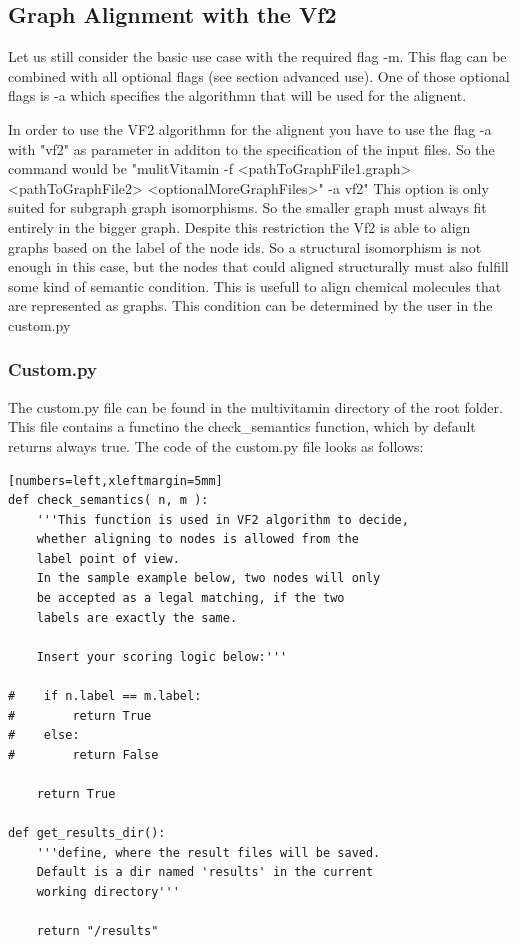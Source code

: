\documentclass{SeminarV2}
\begin{document}
\subsection{Graph Alignment with the Vf2}
Let us still consider the basic use case with the required flag -m. This flag can
be combined with all optional flags (see section advanced use). One of those optional
flags is -a which specifies the algorithmn that will be used for the alignent.

In order to use the VF2 algorithmn for the alignent you have to use the flag
-a with  "vf2" as parameter in additon to the specification of the input files. So the command would be
"mulitVitamin -f <pathToGraphFile1.graph> <pathToGraphFile2> <optionalMoreGraphFiles>" -a vf2"
This option is only suited for subgraph graph isomorphisms. So the smaller graph
must always fit entirely in the bigger graph. Despite this restriction the
Vf2 is able to align graphs based on the label of the node ids. So a structural
isomorphism is not enough in this case, but the nodes that could aligned
structurally must also fulfill some kind of semantic condition. This is
usefull to align chemical molecules that are represented as graphs.
This condition can be determined by the user in the custom.py

\subsubsection{Custom.py}
The custom.py file can be found in the multivitamin directory of the root folder.
This file contains a functino the check\_semantics function, which by default
returns always true. The code of the custom.py file looks as follows:
\begin{verbatim}[numbers=left,xleftmargin=5mm]
def check_semantics( n, m ):
    '''This function is used in VF2 algorithm to decide,
    whether aligning to nodes is allowed from the
    label point of view.
    In the sample example below, two nodes will only
    be accepted as a legal matching, if the two
    labels are exactly the same.

    Insert your scoring logic below:'''

#    if n.label == m.label:
#        return True
#    else:
#        return False

    return True

def get_results_dir():
    '''define, where the result files will be saved.
    Default is a dir named 'results' in the current
    working directory'''

    return "/results"
\end{verbatim}
\end{document}
